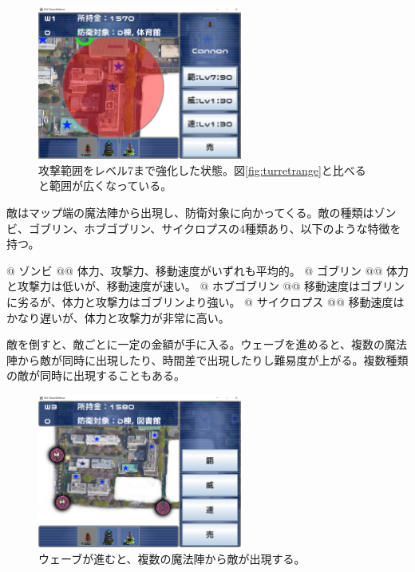 \documentclass[11pt,a4j]{jarticle}
\begin{document}
\begin{figure}[H]
    \begin{center}
        \leavevmode
        \includegraphics[width=0.6\textwidth]{rangeupgraded.png}
        \caption{攻撃範囲をレベル7まで強化した状態。図\ref{fig:turretrange}と比べると範囲が広くなっている。}
        \label{fig:rangeupgraded}
    \end{center}
\end{figure}

敵はマップ端の魔法陣から出現し、防衛対象に向かってくる。敵の種類はゾンビ、ゴブリン、ホブゴブリン、サイクロプスの4種類あり、以下のような特徴を持つ。

\begin{easylist}[itemize]
    @ ゾンビ
    @@ 体力、攻撃力、移動速度がいずれも平均的。
    @ ゴブリン
    @@ 体力と攻撃力は低いが、移動速度が速い。
    @ ホブゴブリン
    @@ 移動速度はゴブリンに劣るが、体力と攻撃力はゴブリンより強い。
    @ サイクロプス
    @@ 移動速度はかなり遅いが、体力と攻撃力が非常に高い。
\end{easylist}

敵を倒すと、敵ごとに一定の金額が手に入る。ウェーブを進めると、複数の魔法陣から敵が同時に出現したり、時間差で出現したりし難易度が上がる。複数種類の敵が同時に出現することもある。

\begin{figure}[H]
    \begin{center}
        \leavevmode
        \includegraphics[width=0.6\textwidth]{multiplespawn.png}
        \caption{ウェーブが進むと、複数の魔法陣から敵が出現する。}
        \label{fig:multiplespawn}
    \end{center}
\end{figure}
\end{document}
